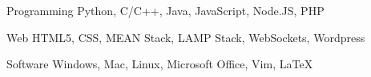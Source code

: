 


\begin{cvskills}


\cvskill
{Programming} %
{Python, C/C++, Java, JavaScript, Node.JS, PHP} %


\cvskill
{Web} %
{HTML5, CSS, MEAN Stack, LAMP Stack, WebSockets, Wordpress} %


\cvskill
{Software} %
{Windows, Mac, Linux, Microsoft Office, Vim, LaTeX} %


\end{cvskills}